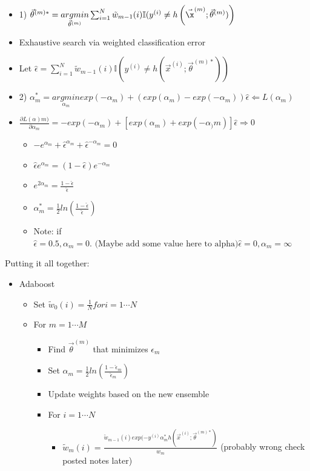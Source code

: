 \documentclass[10pt, oneside]{article}
\begin{document}
\begin{itemize}
    \begin{itemize}
        \item 1) $\vec \theta^{(m)*} = \underset{\vec \theta^{(m)}}{argmin} \sum_{i=1}^N \tilde w_{m-1} (i) \mathbb{I}(y^{(i)} \neq h\left(\vec \x^{(m)} ; \vec \theta^{(m)})\right)$
        \item Exhaustive search via weighted classification error
        \item Let $\hat \epsilon = \sum_{i=1}^N \tilde w_{m-1}(i)\mathbb{I} \left(y^{(i)} \neq h(\vec x^{(i)} ; \vec \theta^{(m)*})\right)$
        \item 2) $\alpha_m^* = \underset{\alpha_m}{argmin} exp(-\alpha_m) + (exp(\alpha_m) - exp(-\alpha_m))\hat \epsilon \Leftarrow L(\alpha_m)$
        \item $\frac{\partial L(\alpha)m)}{\partial \alpha_m} = -exp(-\alpha_m) + [exp(\alpha_m) + exp(-\alpha_)m)] \hat \epsilon \Rightarrow 0$
        \begin{itemize}
            \item $-e^{\alpha_m } + \hat \epsilon^{\alpha_m} + \hat \epsilon^{-\alpha_m} = 0$
            \item $\hat \epsilon e^{\alpha_m} = (1-\hat \epsilon) e^{-\alpha_m}$
            \item $e^{2\alpha_m} = \frac{1-\hat \epsilon}{\hat \epsilon}$
            \item $\alpha_m ^* = \frac{1}{2}ln(\frac{1-\hat \epsilon}{\hat \epsilon})$
            \item Note: if $\hat \epsilon = 0.5, \alpha_m = 0. \text{ (Maybe add some value here to alpha)} \hat \epsilon = 0, \alpha_m = \infty$
        \end{itemize}
    \end{itemize}
\end{itemize}
Putting it all together:
\begin{itemize}
    \item Adaboost
    \begin{itemize}
        \item Set $\tilde w_0 (i) = \frac{1}{N} for i=1\cdots N$
        \item For $m=1\cdots M$
        \begin{itemize}
            \item Find $\vec \theta^{(m)}$ that minimizes $\epsilon_m$
            \item Set $\alpha_m = \frac{1}{2} ln(\frac{1-\hat \epsilon_m}{\hat \epsilon_m})$
            \item Update weights based on the new ensemble
            \item For $i=1\cdots N$
            \begin{itemize}
                \item $\tilde w_m (i) = \frac{\tilde w_{m-1} (i) exp(-y^{(i)} \alpha_m ^* h(\vec x^{(i)} ; \vec \theta^{(m)*})}{w_m}$ (probably wrong check posted notes later)
            \end{itemize}
        \end{itemize}
    \end{itemize}
\end{itemize}
\end{document}
